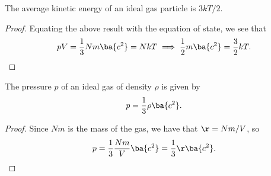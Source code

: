 \begin{corollary}
    The average kinetic energy of an ideal gas particle is $3kT/2$.
\end{corollary}
\begin{proof}
    Equating the above result with the equation of state, we see that \[pV = \frac13 Nm \ba{c^2} = NkT \implies \frac12 m \ba{c^2} = \frac32 kT.\]
\end{proof}

\begin{corollary}
    The pressure $p$ of an ideal gas of density $\rho$ is given by \[p = \frac13 \rho \ba{c^2}.\]
\end{corollary}
\begin{proof}
    Since $Nm$ is the mass of the gas, we have that $\r = Nm/V$, so \[p = \frac13 \frac{Nm}{V} \ba{c^2} = \frac13 \r \ba{c^2}.\]
\end{proof}